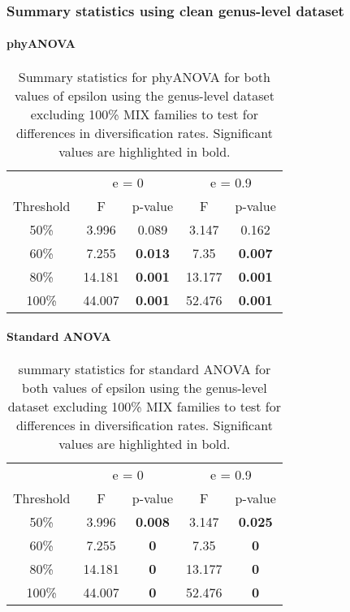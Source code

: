 \documentclass[]{article}
\let\oldparagraph\paragraph
\renewcommand{\paragraph}[1]{\oldparagraph{#1}\mbox{}}
\begin{document}
\hypertarget{summary-statistics-using-clean-genus-level-dataset}{%
\subsubsection{Summary statistics using clean genus-level
dataset}\label{summary-statistics-using-clean-genus-level-dataset}}

\hypertarget{phyanova-4}{%
\paragraph{phyANOVA}\label{phyanova-4}}

\begin{table}[H]

\caption{\label{tab:unnamed-chunk-24}Summary statistics for phyANOVA for both values of epsilon using the genus-level dataset excluding 100\% MIX families to test for differences in diversification rates. Significant values are highlighted in bold.}
\centering
\begin{tabular}{c|c|c|c|c}
\hline
\multicolumn{1}{c|}{ } & \multicolumn{2}{c|}{e = 0} & \multicolumn{2}{c}{e = 0.9} \\
\cline{2-3} \cline{4-5}
Threshold & F & p-value & F & p-value\\
\hline
50\% & 3.996 & 0.089 & 3.147 & 0.162\\
\hline
60\% & 7.255 & \textbf{0.013} & 7.35 & \textbf{0.007}\\
\hline
80\% & 14.181 & \textbf{0.001} & 13.177 & \textbf{0.001}\\
\hline
100\% & 44.007 & \textbf{0.001} & 52.476 & \textbf{0.001}\\
\hline
\end{tabular}
\end{table}

\hypertarget{standard-anova-4}{%
\paragraph{Standard ANOVA}\label{standard-anova-4}}

\begin{table}[H]

\caption{\label{tab:unnamed-chunk-25}summary statistics for standard ANOVA for both values of epsilon using the genus-level dataset excluding 100\% MIX families to test for differences in diversification rates. Significant values are highlighted in bold.}
\centering
\begin{tabular}{c|c|c|c|c}
\hline
\multicolumn{1}{c|}{ } & \multicolumn{2}{c|}{e = 0} & \multicolumn{2}{c}{e = 0.9} \\
\cline{2-3} \cline{4-5}
Threshold & F & p-value & F & p-value\\
\hline
50\% & 3.996 & \textbf{0.008} & 3.147 & \textbf{0.025}\\
\hline
60\% & 7.255 & \textbf{0} & 7.35 & \textbf{0}\\
\hline
80\% & 14.181 & \textbf{0} & 13.177 & \textbf{0}\\
\hline
100\% & 44.007 & \textbf{0} & 52.476 & \textbf{0}\\
\hline
\end{tabular}
\end{table}
\end{document}
